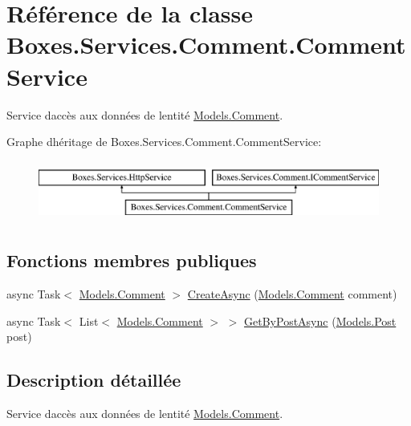 \hypertarget{class_boxes_1_1_services_1_1_comment_1_1_comment_service}{}\section{Référence de la classe Boxes.\+Services.\+Comment.\+Comment\+Service}
\label{class_boxes_1_1_services_1_1_comment_1_1_comment_service}


Service d\textquotesingle{}accès aux données de l\textquotesingle{}entité \hyperlink{class_boxes_1_1_models_1_1_comment}{Models.\+Comment}.  


Graphe d\textquotesingle{}héritage de Boxes.\+Services.\+Comment.\+Comment\+Service\+:\begin{figure}[H]
\begin{center}
\leavevmode
\includegraphics[height=2.000000cm]{class_boxes_1_1_services_1_1_comment_1_1_comment_service}
\end{center}
\end{figure}
\subsection*{Fonctions membres publiques}
\begin{DoxyCompactItemize}
\item 
async Task$<$ \hyperlink{class_boxes_1_1_models_1_1_comment}{Models.\+Comment} $>$ \hyperlink{class_boxes_1_1_services_1_1_comment_1_1_comment_service_adffedabf789162e69424662fe12c74d1}{Create\+Async} (\hyperlink{class_boxes_1_1_models_1_1_comment}{Models.\+Comment} comment)
\item 
async Task$<$ List$<$ \hyperlink{class_boxes_1_1_models_1_1_comment}{Models.\+Comment} $>$ $>$ \hyperlink{class_boxes_1_1_services_1_1_comment_1_1_comment_service_a0335da3b3e22c9a7f96ef0fc0f2a9a40}{Get\+By\+Post\+Async} (\hyperlink{class_boxes_1_1_models_1_1_post}{Models.\+Post} post)
\end{DoxyCompactItemize}


\subsection{Description détaillée}
Service d\textquotesingle{}accès aux données de l\textquotesingle{}entité \hyperlink{class_boxes_1_1_models_1_1_comment}{Models.\+Comment}. 



